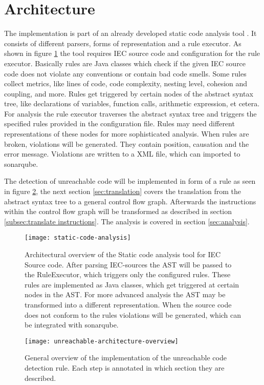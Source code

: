 \section{Architecture}
The implementation is part of an already developed static code analysis tool \cite{Prahofer_2012}. 
It consists of different parsers, forms of representation and a rule executor. 
As shown in figure \ref{fig:general architecture} the tool requires IEC source code and configuration for the rule executor.
Basically rules are Java classes which check if the given IEC source code does not violate any conventions or contain bad code smells. 
Some rules collect metrics, like lines of code, code complexity, nesting level, cohesion and coupling, and more.
Rules get triggered by certain nodes of the abstract syntax tree, like declarations of variables, function calls, arithmetic expression, et cetera.
For analysis the rule executor traverses the abstract syntax tree and triggers the specified rules provided in the configuration file.
Rules may need different representations of these nodes for more sophisticated analysis. 
When rules are broken, violations will be generated. They contain position, causation and the error message. Violations are written to a XML file, which can imported to sonarqube.


The detection of unreachable code will be implemented in form of a rule as seen in figure \ref{fig:unreachable-architecture-overview}, the next section \ref{sec:translation} covers the translation from the abstract syntax tree to a general control flow graph. 
Afterwards the instructions within the control flow graph will be transformed as described in section \ref{subsec:translate instructions}.
The analysis is covered in section \ref{sec:analysis}.

\begin{figure}[h!]
	\centering
	\texttt{[image: static-code-analysis]}
	\caption{Architectural overview of the Static code analysis tool for IEC Source code. After parsing IEC-sources the AST will be passed to the RuleExecutor, which triggers only the configured rules. These rules are implemented as Java classes, which get triggered at certain nodes in the AST. For more advanced analysis the AST may be transformed into a different representation. When the source code does not conform to the rules violations will be generated, which can be integrated with sonarqube.}
	\label{fig:general architecture}
\end{figure}

\begin{figure}[h!]
	\centering
	\texttt{[image: unreachable-architecture-overview]}
	\caption{General overview of the implementation of the unreachable code detection rule. Each step is annotated in which section they are described. }
	\label{fig:unreachable-architecture-overview}
\end{figure}

